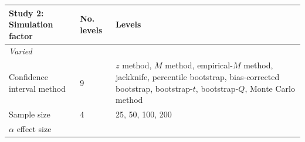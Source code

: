 \documentclass[10,a4paperpaper,]{article}
\begin{document}
\begin{longtable}[]{@{}lll@{}}
\toprule
\begin{minipage}[b]{0.18\columnwidth}\raggedright\strut
Study 2: Simulation factor\strut
\end{minipage} & \begin{minipage}[b]{0.05\columnwidth}\raggedright\strut
No. levels\strut
\end{minipage} & \begin{minipage}[b]{0.37\columnwidth}\raggedright\strut
Levels\strut
\end{minipage}\tabularnewline
\midrule
\endhead
\begin{minipage}[t]{0.18\columnwidth}\raggedright\strut
\emph{Varied}\strut
\end{minipage} & \begin{minipage}[t]{0.05\columnwidth}\raggedright\strut
\strut
\end{minipage} & \begin{minipage}[t]{0.37\columnwidth}\raggedright\strut
\strut
\end{minipage}\tabularnewline
\begin{minipage}[t]{0.18\columnwidth}\raggedright\strut
Confidence interval method\strut
\end{minipage} & \begin{minipage}[t]{0.05\columnwidth}\raggedright\strut
9\strut
\end{minipage} & \begin{minipage}[t]{0.37\columnwidth}\raggedright\strut
\(z\) method, \(M\) method, empirical-\(M\) method, jackknife,
percentile bootstrap, bias-corrected bootstrap, bootstrap-\(t\),
bootstrap-\(Q\), Monte Carlo method\strut
\end{minipage}\tabularnewline
\begin{minipage}[t]{0.18\columnwidth}\raggedright\strut
Sample size\strut
\end{minipage} & \begin{minipage}[t]{0.05\columnwidth}\raggedright\strut
4\strut
\end{minipage} & \begin{minipage}[t]{0.37\columnwidth}\raggedright\strut
25, 50, 100, 200\strut
\end{minipage}\tabularnewline
\begin{minipage}[t]{0.18\columnwidth}\raggedright\strut
\(\alpha\) effect size\strut
\end{minipage} & \begin{minipage}[t]{0.05\columnwidth}\raggedright\strut

\end{minipage}
\end{longtable}
\end{document}
